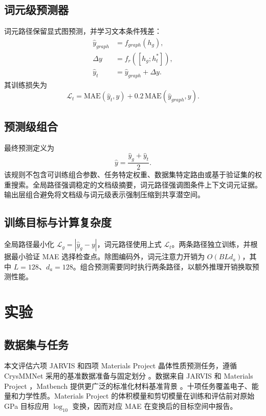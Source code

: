 \documentclass[a4paper,fleqn]{cas-sc}
\begin{document}
\subsection{词元级预测器}
词元路径保留显式图预测，并学习文本条件残差：
\begin{align}\hat y_{graph}&=f_{graph}(h_g),\\\Delta y&=f_r([h_g;h_t^*]),\\\hat y_t&=\hat y_{graph}+\Delta y.\end{align}
其训练损失为
\begin{equation}\mathcal L_t=\mathrm{MAE}(\hat y_t,y)+0.2\,\mathrm{MAE}(\hat y_{graph},y).\end{equation}

\subsection{预测级组合}
最终预测定义为
\begin{equation}\boxed{\hat y=\frac{\hat y_g+\hat y_t}{2}}.\end{equation}
该规则不包含可训练组合参数、任务特定权重、数据集特定路由或基于验证集的权重搜索。全局路径强调稳定的文档级摘要，词元路径强调图条件上下文词元证据。输出层组合避免将文档级与词元级表示强制压缩到共享潜空间。

\subsection{训练目标与计算复杂度}
全局路径最小化 $\mathcal L_g=|\hat y_g-y|$，词元路径使用上式 $\mathcal L_t$。两条路径独立训练，并根据最小验证 MAE 选择检查点。除图编码外，词元注意力开销为 $O(BLd_a)$，其中 $L=128$、$d_a=128$。组合预测需要同时执行两条路径，以额外推理开销换取预测性能。

\section{实验}
\subsection{数据集与任务}
本文评估六项 JARVIS 和四项 Materials Project 晶体性质预测任务，遵循 CrysMMNet 采用的基准数据准备与固定划分 \citep{das2023crysmmnet}。数据来自 JARVIS 和 Materials Project \citep{choudhary2020jarvis,jain2013materialsproject}，Matbench 提供更广泛的标准化材料基准背景 \citep{dunn2020matbench}。十项任务覆盖电子、能量和力学性质。Materials Project 的体积模量和剪切模量在训练和评估前对原始 GPa 目标应用 $\log_{10}$ 变换，因而对应 MAE 在变换后的目标空间中报告。
\end{document}
